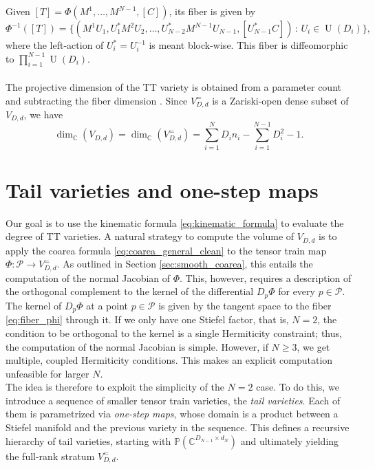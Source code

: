 \documentclass{article}
\theoremstyle{definition}
\DeclareMathOperator{\U}{U}
\newcommand{\C}{\mathbb{C}}
\renewcommand{\P}{\mathbb{P}}
\begin{document}
Given $[T] = \Phi(M^1,\dots,M^{N-1},[C])$, its fiber is given by 
\begin{equation}\label{eq:fiber_phi}
    \Phi^{-1}([T]) = \{(M^1U_1, U_1^* M^2 U_2, \dots, U_{N-2}^*M^{N-1} U_{N-1}, [U_{N-1}^*C])\, :\, U_i \in \U(D_i)\},
\end{equation}
where the left-action of $U_i^*=U_i^{-1}$ is meant block-wise. This fiber is diffeomorphic to $\prod_{i=1}^{N-1}
\U(D_i)$.
\\ ~ \\
The projective dimension of the TT variety is obtained from a parameter count and subtracting the fiber dimension \cite{Bernardi_2022}. Since $V_{D,d}^=$ is a Zariski-open dense subset of $V_{D,d}$, we have 
\begin{equation}\label{eq:V_dimension}
    \dim_{\C}(V_{D,d})=\dim_{\C}(V_{D,d}^=) = \sum_{i=1}^{N}D_{i}n_i - \sum_{i=1}^{N-1}D_i^2 -1.
\end{equation}


\section{Tail varieties and one-step maps}\label{sec:tail_var_and_psi_r} 

Our goal is to use the kinematic formula \eqref{eq:kinematic_formula} to evaluate the degree of TT varieties. A natural strategy to compute the volume of $V_{D,d}$ is to apply the coarea formula \eqref{eq:coarea_general_clean} to the tensor train map $\Phi:\mathcal P\to V^{=}_{D,d}$. As outlined in Section \ref{sec:smooth_coarea}, this entails the computation of the normal Jacobian of $\Phi$. This, however, requires a description of the orthogonal complement to the kernel of the differential $D_p\Phi$ for every $p \in \mathcal P$. \\ 

\noindent The kernel of $D_p\Phi$ at a point $p \in \mathcal P$ is given by the tangent space to the fiber \eqref{eq:fiber_phi} through it. If we only have one Stiefel factor, that is, $N=2$, the condition to be orthogonal to the kernel is a single Hermiticity constraint; thus, the computation of the normal Jacobian is simple. However, if $N\geq 3$, we get multiple, coupled Hermiticity conditions. This makes an explicit computation unfeasible for larger $N$. \\

The idea is therefore to exploit the simplicity of the $N=2$ case. To do this, we introduce a sequence of smaller tensor train varieties, the \emph{tail varieties}. Each of them is parametrized via \emph{one-step maps}, whose domain is a product between a Stiefel manifold and the previous variety in the sequence. This defines a recursive hierarchy of tail varieties, starting with $\P(\C^{D_{N-1}\times d_N})$ and ultimately yielding the full-rank stratum $V_{D,d}^=$. 
\end{document}
